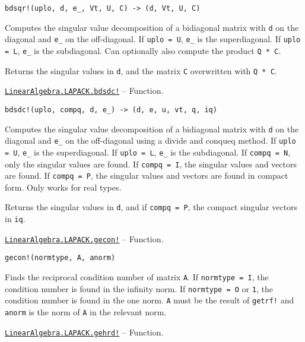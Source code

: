 \begin{adjustwidth}{2em}{0pt}


\begin{verbatim}
bdsqr!(uplo, d, e_, Vt, U, C) -> (d, Vt, U, C)
\end{verbatim}

Computes the singular value decomposition of a bidiagonal matrix with \texttt{d} on the diagonal and \texttt{e\_} on the off-diagonal. If \texttt{uplo = U}, \texttt{e\_} is the superdiagonal. If \texttt{uplo = L}, \texttt{e\_} is the subdiagonal. Can optionally also compute the product \texttt{Q{\textquotesingle} * C}.

Returns the singular values in \texttt{d}, and the matrix \texttt{C} overwritten with \texttt{Q{\textquotesingle} * C}.



\end{adjustwidth}
\hypertarget{2117266507846761835}{}
\hyperlink{2117266507846761835}{\texttt{LinearAlgebra.LAPACK.bdsdc!}}  -- {Function.}

\begin{adjustwidth}{2em}{0pt}


\begin{verbatim}
bdsdc!(uplo, compq, d, e_) -> (d, e, u, vt, q, iq)
\end{verbatim}

Computes the singular value decomposition of a bidiagonal matrix with \texttt{d} on the diagonal and \texttt{e\_} on the off-diagonal using a divide and conqueq method. If \texttt{uplo = U}, \texttt{e\_} is the superdiagonal. If \texttt{uplo = L}, \texttt{e\_} is the subdiagonal. If \texttt{compq = N}, only the singular values are found. If \texttt{compq = I}, the singular values and vectors are found. If \texttt{compq = P}, the singular values and vectors are found in compact form. Only works for real types.

Returns the singular values in \texttt{d}, and if \texttt{compq = P}, the compact singular vectors in \texttt{iq}.



\end{adjustwidth}
\hypertarget{3277861361503147277}{}
\hyperlink{3277861361503147277}{\texttt{LinearAlgebra.LAPACK.gecon!}}  -- {Function.}

\begin{adjustwidth}{2em}{0pt}


\begin{verbatim}
gecon!(normtype, A, anorm)
\end{verbatim}

Finds the reciprocal condition number of matrix \texttt{A}. If \texttt{normtype = I}, the condition number is found in the infinity norm. If \texttt{normtype = O} or \texttt{1}, the condition number is found in the one norm. \texttt{A} must be the result of \texttt{getrf!} and \texttt{anorm} is the norm of \texttt{A} in the relevant norm.



\end{adjustwidth}
\hypertarget{14367369116295032587}{}
\hyperlink{14367369116295032587}{\texttt{LinearAlgebra.LAPACK.gehrd!}}  -- {Function.}


